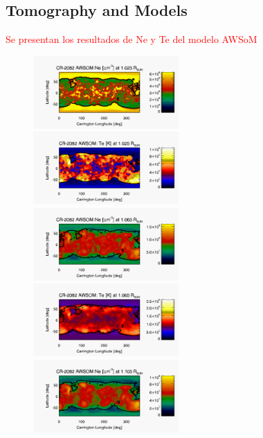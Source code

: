 \documentclass[namedreferences]{solarphysics}
\begin{document}
\begin{article}
\subsection{Tomography and Models}\label{awsom_res} 

\textcolor{red}{Se presentan los resultados de Ne y Te del modelo AWSoM}

\begin{figure}[h!]
\begin{center}
\includegraphics[width=0.495\textwidth]{figs/map_Ne_awsom_2082_185_short_1025_Rsun.pdf}
\includegraphics[width=0.495\textwidth]{figs/map_Te_awsom_2082_185_short_1025_Rsun.pdf}
\includegraphics[width=0.495\textwidth]{figs/map_Ne_awsom_2082_185_short_1065_Rsun.pdf}
\includegraphics[width=0.495\textwidth]{figs/map_Te_awsom_2082_185_short_1065_Rsun.pdf}
\includegraphics[width=0.495\textwidth]{figs/map_Ne_awsom_2082_185_short_1105_Rsun.pdf}

\end{center}
\end{figure}
\end{article}
\end{document}
